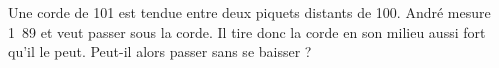 
\begin{exercice}\label{exosmath-0786}

    Une corde de \unit{101}{\meter} est tendue entre deux piquets distants de \unit{100}{\meter}. André mesure \unit{1.89}{\meter} et veut passer sous la corde. Il tire donc la corde en son milieu aussi fort qu'il le peut. Peut-il alors passer sans se baisser ?

\end{exercice}
